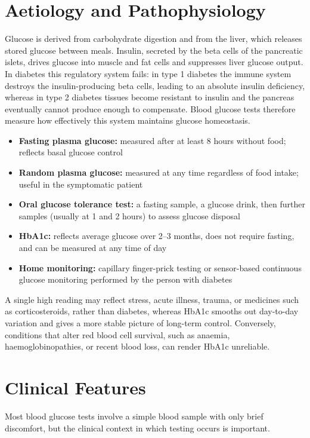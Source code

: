 \section*{Aetiology and Pathophysiology}
Glucose is derived from carbohydrate digestion and from the liver, which releases stored glucose between meals. Insulin, secreted by the beta cells of the pancreatic islets, drives glucose into muscle and fat cells and suppresses liver glucose output. In diabetes this regulatory system fails: in type 1 diabetes the immune system destroys the insulin-producing beta cells, leading to an absolute insulin deficiency, whereas in type 2 diabetes tissues become resistant to insulin and the pancreas eventually cannot produce enough to compensate. Blood glucose tests therefore measure how effectively this system maintains glucose homeostasis.

\begin{itemize}
    \item \textbf{Fasting plasma glucose:} measured after at least 8 hours without food; reflects basal glucose control
    \item \textbf{Random plasma glucose:} measured at any time regardless of food intake; useful in the symptomatic patient
    \item \textbf{Oral glucose tolerance test:} a fasting sample, a glucose drink, then further samples (usually at 1 and 2 hours) to assess glucose disposal
    \item \textbf{HbA1c:} reflects average glucose over 2--3 months, does not require fasting, and can be measured at any time of day
    \item \textbf{Home monitoring:} capillary finger-prick testing or sensor-based continuous glucose monitoring performed by the person with diabetes
\end{itemize}

A single high reading may reflect stress, acute illness, trauma, or medicines such as corticosteroids, rather than diabetes, whereas HbA1c smooths out day-to-day variation and gives a more stable picture of long-term control. Conversely, conditions that alter red blood cell survival, such as anaemia, haemoglobinopathies, or recent blood loss, can render HbA1c unreliable.

\section*{Clinical Features}
Most blood glucose tests involve a simple blood sample with only brief discomfort, but the clinical context in which testing occurs is important.

